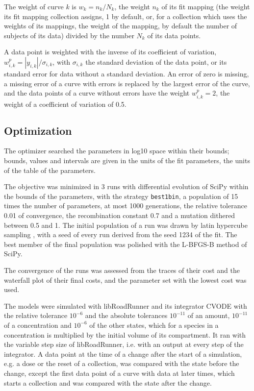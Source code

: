 The weight of curve $k$ is $w_k = n_k / N_k$, the weight $n_k$ of its fit mapping (the weight its fit mapping collection assigns, 1 by default, or, for a collection which uses the weights of its mappings, the weight of the mapping, by default the number of subjects of its data) divided by the number $N_k$ of its data points.

A data point is weighted with the inverse of its coefficient of variation, $w^{p}_{i,k} = |y_{i,k}| / \sigma_{i,k}$, with $\sigma_{i,k}$ the standard deviation of the data point, or its standard error for data without a standard deviation. An error of zero is missing, a missing error of a curve with errors is replaced by the largest error of the curve, and the data points of a curve without errors have the weight $w^{p}_{i,k} = 2$, the weight of a coefficient of variation of 0.5.

\subsection{Optimization}

The optimizer searched the parameters in log10 space within their bounds; bounds, values and intervals are given in the units of the fit parameters, the units of the table of the parameters.

The objective was minimized in 3 runs with differential evolution \cite{Storn1997} of SciPy \cite{Virtanen2020} within the bounds of the parameters, with the strategy \texttt{best1bin}, a population of 15 times the number of parameters, at most 1000 generations, the relative tolerance 0.01 of convergence, the recombination constant 0.7 and a mutation dithered between 0.5 and 1. The initial population of a run was drawn by latin hypercube sampling \cite{McKay1979}, with a seed of every run derived from the seed 1234 of the fit. The best member of the final population was polished with the L-BFGS-B method of SciPy.

The convergence of the runs was assessed from the traces of their cost and the waterfall plot of their final costs, and the parameter set with the lowest cost was used.

The models were simulated with libRoadRunner \cite{Welsh2023} and its integrator CVODE \cite{Hindmarsh2005} with the relative tolerance $10^{-6}$ and the absolute tolerances $10^{-11}$ of an amount, $10^{-11}$ of a concentration and $10^{-6}$ of the other states, which for a species in a concentration is multiplied by the initial volume of its compartment. It ran with the variable step size of libRoadRunner, i.e. with an output at every step of the integrator. A data point at the time of a change after the start of a simulation, e.g. a dose or the reset of a collection, was compared with the state before the change, except the first data point of a curve with data at later times, which starts a collection and was compared with the state after the change.

